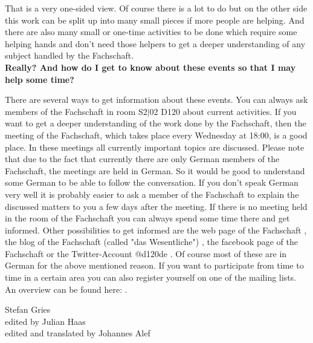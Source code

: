 {    That is a very one-sided view. Of course there is a lot to do but on the other side this work can be split up into many small pieces if more people are helping. And there are also many small or one-time activities to be done which require some helping hands and don't need those helpers to get a deeper understanding of any subject handled by the Fachschaft.\\

    \textbf{Really? And how do I get to know about these events so that I may help some time?}

    There are several ways to get information about these events. You can always ask members of the Fachschaft in room S2$|$02 D120 about current activities. If you want to get a deeper understanding of the work done by the Fachschaft, then the meeting of the Fachschaft, which takes place every Wednesday at 18:00, is a good place. In these meetings all currently important topics are discussed. Please note that due to the fact that currently there are only German members of the Fachschaft, the meetings are held in German. So it would be good to understand some German to be able to follow the conversation. If you don't speak German very well it is probably easier to ask a member of the Fachschaft to explain the discussed matters to you a few days after the meeting. If there is no meeting held in the room of the Fachschaft you can always spend some time there and get informed. Other possibilities to get informed are the web page of the Fachschaft \footnotemark[3], the blog of the Fachschaft (called "das Wesentliche") \footnotemark[4], the facebook page of the Fachschaft \footnotemark[5] or the Twitter-Account @d120de \footnotemark[6]. Of course most of these are in German for the above mentioned reason. If you want to participate from time to time in a certain area you can also register yourself on one of the mailing lists. An overview can be found here: \footnotemark[7].
}
{Stefan Gries\\
    edited by Julian Haas\\
    edited and translated by Johannes Alef}



